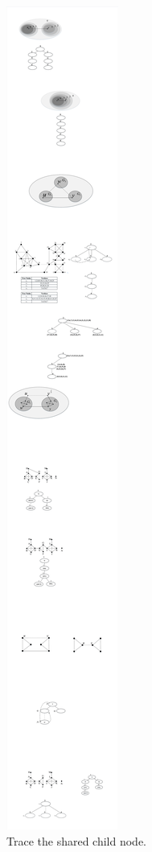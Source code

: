 \begin{figure}[ht]
    \centering
    \includegraphics[width=0.5\linewidth]{figures/traceChild}
    \caption{Trace the shared child node.}
    \label{fig:trace}
\end{figure}

